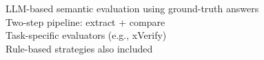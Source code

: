 \documentclass[preview]{standalone}
\begin{document}
LLM-based semantic evaluation using ground-truth answers\\Two-step pipeline: extract + compare\\Task-specific evaluators (e.g., xVerify)\\Rule-based strategies also included\\
\end{document}
